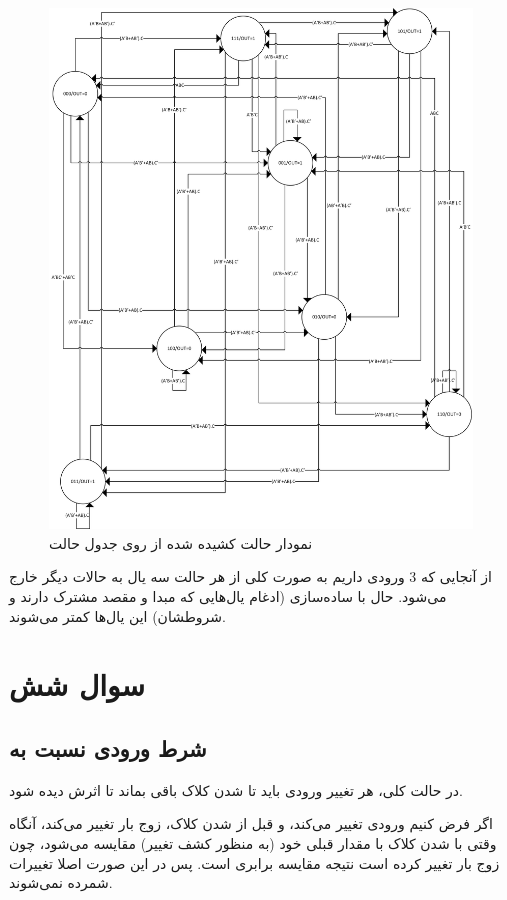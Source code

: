 \documentclass[fleqn]{article}
\begin{document}
\begin{figure}[!htbp]
	\centering
	\includegraphics[width=\linewidth]{3stateDiagram.png}
	\caption{نمودار حالت کشیده شده از روی جدول حالت}
	\label{stateDiagram3}
\end{figure}

از آنجایی که 3 ورودی داریم به صورت کلی از هر حالت سه یال به حالات دیگر خارج می‌شود. حال 
با ساده‌سازی (ادغام یال‌هایی که مبدا و مقصد مشترک دارند و شروطشان) این یال‌ها کمتر می‌شوند.

\section{سوال شش}
\subsection{شرط ورودی  نسبت به }
در حالت کلی، هر تغییر ورودی
باید تا
شدن کلاک باقی بماند تا اثرش دیده شود.

اگر فرض کنیم ورودی
تغییر می‌کند، و قبل از
شدن کلاک، زوج بار تغییر می‌کند، آنگاه وقتی با
شدن کلاک با مقدار قبلی خود (به منظور کشف تغییر) مقایسه می‌شود، چون زوج بار تغییر کرده است نتیجه مقایسه برابری
است. پس در این صورت اصلا تغییرات شمرده نمی‌شوند.
\end{document}
